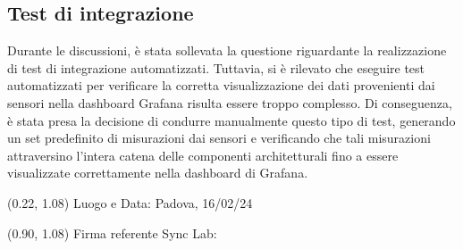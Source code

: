 \documentclass{article}
\begin{document}
    \subsection{Test di integrazione}
    Durante le discussioni, è stata sollevata la questione riguardante la realizzazione di test di integrazione automatizzati. Tuttavia, si è rilevato che eseguire test automatizzati per verificare la corretta visualizzazione dei dati provenienti dai sensori nella dashboard Grafana risulta essere troppo complesso. Di conseguenza, è stata presa la decisione di condurre manualmente questo tipo di test, generando un set predefinito di misurazioni dai sensori e verificando che tali misurazioni attraversino l'intera catena delle componenti architetturali fino a essere visualizzate correttamente nella dashboard di Grafana.



\begin{textblock*}{\textwidth}(0.22\textwidth, 1.08\textheight)
    Luogo e Data: Padova, 16/02/24
\end{textblock*}

\begin{textblock*}{\textwidth}(0.90\textwidth, 1.08\textheight)
        Firma referente Sync Lab:
\end{textblock*}
\end{document}
